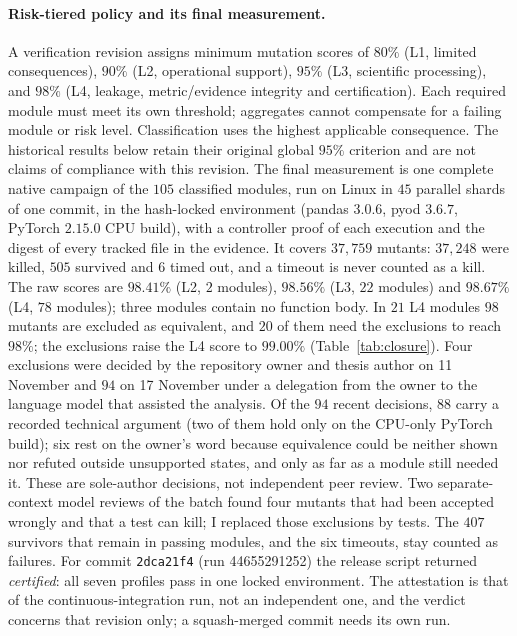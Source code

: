 \documentclass[conference]{IEEEtran}
\begin{document}
\paragraph{Risk-tiered policy and its final measurement.}
A verification revision assigns minimum mutation scores of $80\%$
(L1, limited consequences), $90\%$ (L2, operational support), $95\%$ (L3,
scientific processing), and $98\%$ (L4, leakage, metric/evidence integrity and
certification). Each required module must meet its own threshold; aggregates
cannot compensate for a failing module or risk level. Classification uses the
highest applicable consequence. The historical results below retain their
original global $95\%$ criterion and are not claims of compliance with this revision.
The final measurement is one complete native campaign of the $105$ classified modules, run on Linux in
$45$ parallel shards of one commit, in the hash-locked environment (pandas $3.0.6$, pyod $3.6.7$, PyTorch $2.15.0$ CPU build), with a controller proof of each execution and the digest of every
tracked file in the evidence. It covers $37{,}759$ mutants: $37{,}248$ were killed, $505$ survived and
$6$ timed out, and a timeout is never counted as a kill. The raw scores are $98.41\%$ (L2, $2$ modules),
$98.56\%$ (L3, $22$ modules) and $98.67\%$ (L4, $78$ modules); three modules contain no function body.
In $21$ L4 modules $98$ mutants are excluded as equivalent, and $20$ of them need the exclusions to reach $98\%$; the exclusions raise the L4
score to $99.00\%$ (Table~\ref{tab:closure}). Four exclusions were decided by the repository owner and thesis author
on 11 November and $94$ on 17 November under a delegation from the owner to the language model that assisted
the analysis. Of the $94$ recent decisions, $88$ carry a recorded technical argument (two of them hold only on the CPU-only PyTorch build); six rest on the owner's word because equivalence
could be neither shown nor refuted outside unsupported states, and only as far as a module still needed it.
These are sole-author decisions, not independent peer review. Two separate-context model reviews of the batch
found four mutants that had been accepted wrongly and that a test can kill; I replaced those exclusions by tests.
The $407$ survivors that remain in passing modules, and the six timeouts, stay counted as failures. For commit \texttt{2dca21f4} (run 44655291252) the release script returned \emph{certified}:
all seven profiles pass in one locked environment. The attestation is that of the continuous-integration run, not an independent one, and the verdict
concerns that revision only; a squash-merged commit needs its own run.
\end{document}
